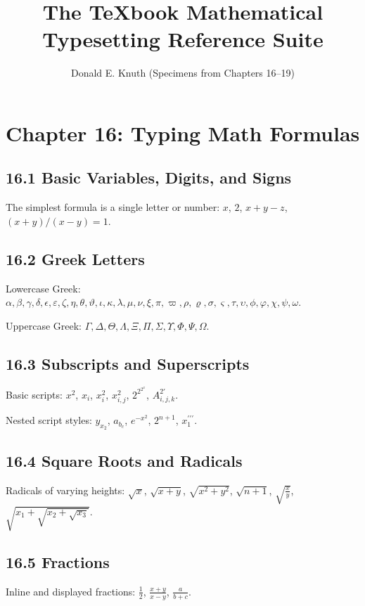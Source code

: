 \documentclass{article}
\title{The TeXbook Mathematical Typesetting Reference Suite}
\author{Donald E. Knuth (Specimens from Chapters 16--19)}
\date{}
\begin{document}
\maketitle

\section*{Chapter 16: Typing Math Formulas}

\subsection*{16.1 Basic Variables, Digits, and Signs}
The simplest formula is a single letter or number:
$x$, $2$, $x + y - z$, $(x + y)/(x - y) = 1$.

\subsection*{16.2 Greek Letters}
Lowercase Greek:
$\alpha, \beta, \gamma, \delta, \epsilon, \varepsilon, \zeta, \eta, \theta, \vartheta, \iota, \kappa, \lambda, \mu, \nu, \xi, \pi, \varpi, \rho, \varrho, \sigma, \varsigma, \tau, \upsilon, \phi, \varphi, \chi, \psi, \omega$.

Uppercase Greek:
$\Gamma, \Delta, \Theta, \Lambda, \Xi, \Pi, \Sigma, \Upsilon, \Phi, \Psi, \Omega$.

\subsection*{16.3 Subscripts and Superscripts}
Basic scripts:
$x^2$, $x_i$, $x_i^2$, $x_{i,j}^2$, $2^{2^{2^x}}$, $A_{i,j,k}^{2\prime}$.

Nested script styles:
$y_{x_2}$, $a_{b_c}$, $e^{-x^2}$, $2^{n+1}$, $x_1^{\prime\prime\prime}$.

\subsection*{16.4 Square Roots and Radicals}
Radicals of varying heights:
$\sqrt{x}$, $\sqrt{x+y}$, $\sqrt{x^2 + y^2}$, $\sqrt{n+1}$, $\sqrt{\frac{x}{y}}$, $\sqrt{x_1 + \sqrt{x_2 + \sqrt{x_3}}}$.

\subsection*{16.5 Fractions}
Inline and displayed fractions:
$\frac{1}{2}$, $\frac{x+y}{x-y}$, $\frac{a}{b+c}$.
\end{document}
